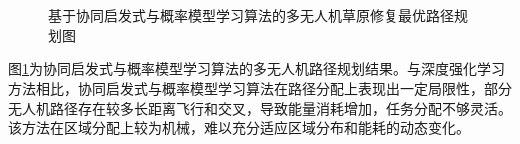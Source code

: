 \documentclass[AutoFakeBold]{LZUThesis}
\begin{document}
\begin{figure}[H]
	\centering
	\subfloat[60点500边长4机]{\label{fig:ILS_60_500_4}}
	\subfloat[60点500边长6机]{\label{fig:ILS_60_500_6}} 
	\subfloat[60点500边长8机]{\label{fig:ILS_60_500_8}}\\
	\subfloat[60点600边长4机]{\label{fig:ILS_60_600_4}}
	\subfloat[60点600边长6机]{\label{fig:ILS_60_600_6}}
	\subfloat[60点600边长8机]{\label{fig:ILS_60_600_8}}\\
	\subfloat[60点700边长4机]{\label{fig:ILS_60_700_4}}
	\subfloat[60点700边长6机]{\label{fig:ILS_60_700_6}}
	\subfloat[60点700边长8机]{\label{fig:ILS_60_700_8}}
	\caption{基于协同启发式与概率模型学习算法的多无人机草原修复最优路径规划图}
	\label{fig:CHAPBILM_combined_uav_routes}
\end{figure}

图\ref{fig:CHAPBILM_combined_uav_routes}为协同启发式与概率模型学习算法的多无人机路径规划结果。与深度强化学习方法相比，协同启发式与概率模型学习算法在路径分配上表现出一定局限性，部分无人机路径存在较多长距离飞行和交叉，导致能量消耗增加，任务分配不够灵活。该方法在区域分配上较为机械，难以充分适应区域分布和能耗的动态变化。
\end{document}
